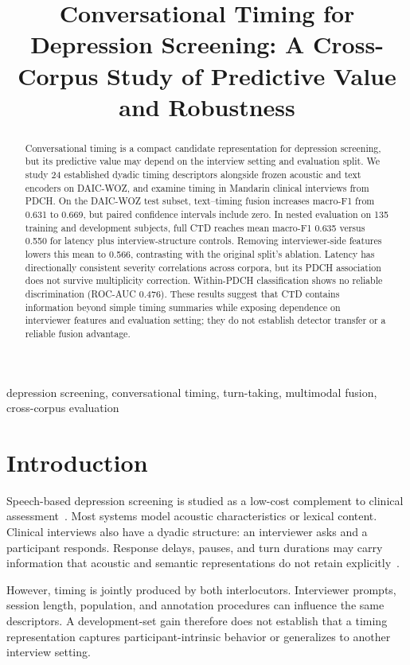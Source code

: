 \documentclass{article}
\title{Conversational Timing for Depression Screening: A Cross-Corpus Study of Predictive Value and Robustness}
\begin{document}
%
\maketitle
%
\begin{abstract}
Conversational timing is a compact candidate representation for depression screening, but its predictive value may depend on the interview setting and evaluation split. We study 24 established dyadic timing descriptors alongside frozen acoustic and text encoders on DAIC-WOZ, and examine timing in Mandarin clinical interviews from PDCH. On the DAIC-WOZ test subset, text--timing fusion increases macro-F1 from 0.631 to 0.669, but paired confidence intervals include zero. In nested evaluation on 135 training and development subjects, full CTD reaches mean macro-F1 0.635 versus 0.550 for latency plus interview-structure controls. Removing interviewer-side features lowers this mean to 0.566, contrasting with the original split's ablation. Latency has directionally consistent severity correlations across corpora, but its PDCH association does not survive multiplicity correction. Within-PDCH classification shows no reliable discrimination (ROC-AUC 0.476). These results suggest that CTD contains information beyond simple timing summaries while exposing dependence on interviewer features and evaluation setting; they do not establish detector transfer or a reliable fusion advantage.
\end{abstract}

\begin{keywords}
depression screening, conversational timing, turn-taking, multimodal fusion, cross-corpus evaluation
\end{keywords}

\section{Introduction}
Speech-based depression screening is studied as a low-cost complement to clinical assessment~\cite{valstar2013avec,valstar2016avec,cummins2015review}. Most systems model acoustic characteristics or lexical content. Clinical interviews also have a dyadic structure: an interviewer asks and a participant responds. Response delays, pauses, and turn durations may carry information that acoustic and semantic representations do not retain explicitly~\cite{yamamoto2020timing,mundt2012vocal,aldeneh2019mood}.

However, timing is jointly produced by both interlocutors. Interviewer prompts, session length, population, and annotation procedures can influence the same descriptors. A development-set gain therefore does not establish that a timing representation captures participant-intrinsic behavior or generalizes to another interview setting.
\end{document}
